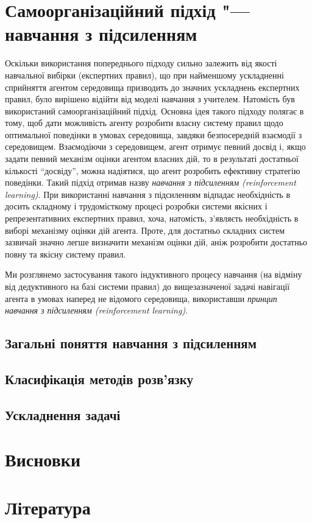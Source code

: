 \documentclass[a4paper,10pt]{article}
\begin{document}
\section{Самоорганізаційний підхід "--- навчання з підсиленням}

Оскільки використання попереднього підходу сильно залежить від якості навчальної вибірки (експертних правил), що при найменшому ускладненні сприйняття агентом середовища призводить до значних ускладнень експертних правил, було вирішено відійти від моделі навчання з учителем. Натомість був використаний самоорганізаційний підхід. Основна ідея такого підходу полягає в тому, щоб дати можливість агенту розробити власну систему правил щодо оптимальної поведінки в умовах середовища, завдяки безпосередній взаємодії з середовищем. Взаємодіючи з середовищем, агент отримує певний досвід і, якщо задати певний механізм оцінки агентом власних дій, то в результаті достатньої кількості ``досвіду'', можна надіятися, що агент розробить ефективну стратегію поведінки. Такий підхід отримав назву \emph{навчання з підсиленням (reinforcement learning)}. При використанні навчання з підсиленням відпадає необхідність в досить складному і трудомісткому процесі розробки системи якісних і репрезентативних експертних правил, хоча, натомість, з'являєть необхідність в виборі механізму оцінки дій агента. Проте, для достатньо складних систем зазвичай значно легше визначити механізм оцінки дій, аніж розробити достатньо повну та якісну систему правил. 

Ми розглянемо застосування такого індуктивного процесу навчання (на відміну від дедуктивного на базі системи правил) до вищезазначеної задачі навігації агента в умовах наперед не відомого середовища, використавши \emph{принцип навчання з підсиленням (reinforcement learning)}.

\subsection{Загальні поняття навчання з підсиленням}
\subsection{Класифікація методів розв'язку}
\subsection{Ускладнення задачі}
\section{Висновки}
\section{Література}
\begin{thebibliography}{99}
\end{thebibliography}
\end{document}
